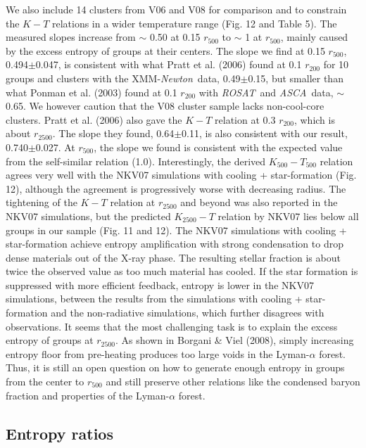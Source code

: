 \documentclass{aastex}
\def\asca       {{\em ASCA}\/}
\def\xmm        {XMM-{\em Newton}\/}
\def\rosat      {{\em ROSAT}\/}
\begin{document}
We also include 14 clusters from V06 and V08 for comparison and to constrain the
$K - T$ relations in a wider temperature range (Fig. 12 and Table 5). The measured
slopes increase from $\sim$ 0.50 at 0.15 $r_{500}$ to $\sim$ 1 at $r_{500}$, mainly
caused by the excess entropy of groups at their centers.
The slope we find at 0.15 $r_{500}$, 0.494$\pm$0.047, is consistent with what
Pratt et al. (2006) found at 0.1 $r_{200}$ for 10 groups and clusters with the \xmm\
data, 0.49$\pm$0.15, but smaller than what Ponman et al. (2003) found at 0.1 $r_{200}$
with \rosat\ and \asca\ data, $\sim$ 0.65. We however caution that the V08 cluster sample
lacks non-cool-core clusters. Pratt et al. (2006) also gave the $K - T$ relation at
0.3 $r_{200}$, which is about $r_{2500}$. The slope they found, 0.64$\pm$0.11, is
also consistent with our result, 0.740$\pm$0.027.
At $r_{500}$, the slope we found is consistent with the expected value from the
self-similar relation (1.0).
Interestingly, the derived $K_{500} - T_{500}$ relation agrees very well with the
NKV07 simulations with cooling + star-formation (Fig. 12), although the agreement
is progressively worse with decreasing radius. The tightening of the $K - T$ relation
at $r_{2500}$ and beyond was also reported in the NKV07 simulations, but the predicted
$K_{2500} - T$ relation by NKV07 lies below all groups in our sample (Fig. 11 and 12).
The NKV07 simulations with cooling + star-formation achieve entropy amplification
with strong condensation to drop dense materials out of the X-ray phase. The
resulting stellar fraction is about twice the observed value as too much
material has cooled. If the star formation is suppressed with more efficient
feedback, entropy is lower in the NKV07 simulations, between the results from the
simulations with cooling + star-formation
and the non-radiative simulations, which further disagrees with observations.
It seems that the most challenging task is to explain the excess entropy of groups at $r_{2500}$.
As shown in Borgani \& Viel (2008), simply increasing entropy floor from pre-heating
produces too large voids in the Lyman-$\alpha$ forest.
Thus, it is still an open question on how to generate enough entropy in groups
from the center to $r_{500}$ and still preserve other relations like the condensed
baryon fraction and properties of the Lyman-$\alpha$ forest.

\subsection{Entropy ratios}
\end{document}
